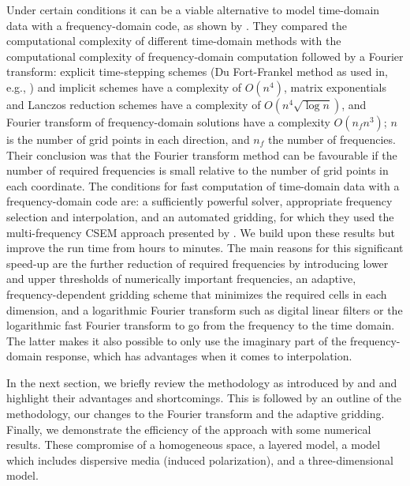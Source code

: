 \documentclass[extra, camera,%
]{gji}
\begin{document}
Under certain conditions it can be a viable alternative to model time-domain
data with a frequency-domain code, as shown by \cite{GEO.08.Mulder}. They
compared the computational complexity of different time-domain methods with the
computational complexity of frequency-domain computation followed by a Fourier
transform: explicit time-stepping schemes (Du Fort-Frankel method as used in,
e.g., \cite{GEO.04.Commer, GEO.07.Maao}) and implicit schemes \citep[e.g.,
][]{GEO.04.Haber,GEO.10.Um} have a complexity of $O(n^4)$, matrix exponentials
and Lanczos reduction schemes \cite[e.g., ][]{RS.94.Druskin} have a complexity
of $O(n^4\sqrt{\log n})$, and Fourier transform of frequency-domain solutions
have a complexity $O(n_f n^3)$; $n$ is the number of grid points in each
direction, and $n_f$ the number of frequencies. Their conclusion was that the
Fourier transform method can be favourable if the number of required
frequencies is small relative to the number of grid points in each coordinate.
The conditions for fast computation of time-domain data with a frequency-domain
code are: a sufficiently powerful solver, appropriate frequency selection and
interpolation, and an automated gridding, for which they used the
multi-frequency CSEM approach presented by \cite{GEO.07.Plessix}. We build upon
these results but improve the run time from hours to minutes. The main reasons
for this significant speed-up are the further reduction of required frequencies
by introducing lower and upper thresholds of numerically important frequencies,
an adaptive, frequency-dependent gridding scheme that minimizes the required
cells in each dimension, and a logarithmic Fourier transform such as digital
linear filters \citep[DLF, ][]{GP.71.Ghosh} or the logarithmic fast Fourier
transform \citep[FFTLog, ][]{RAS.00.Hamilton} to go from the frequency to the
time domain. The latter makes it also possible to only use the imaginary part
of the frequency-domain response, which has advantages when it comes to
interpolation.

In the next section, we briefly review the methodology as introduced by
\cite{GEO.07.Plessix} and \cite{GEO.08.Mulder} and highlight their advantages
and shortcomings. This is followed by an outline of the methodology, our
changes to the Fourier transform and the adaptive gridding. Finally, we
demonstrate the efficiency of the approach with some numerical results. These
compromise of a homogeneous space, a layered model, a model which includes
dispersive media (induced polarization), and a three-dimensional model.
\end{document}
